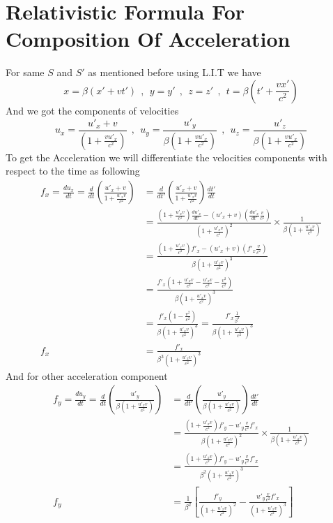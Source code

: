 \section{Relativistic Formula For Composition Of Acceleration}
For same $S$ and $S'$ as mentioned before using L.I.T we have 
\[
x= \beta(x'+vt') 
\ \ , \ \ 
y = y' 
\ \ , \ \ 
z = z' 
\ \ , \ \ 
t =\beta\left(t' + \frac{vx'}{c^2}\right)
\]
And we got the components of velocities
\[
u_x = \frac{u'_x + v}{\left(1 + \frac{vu'_x}{c^2}\right)}
\ \ , \ \ 
u_y = \frac{u'_y}{\beta\left(1 + \frac{vu'_x}{c^2}\right)}
\ \ , \ \ 
u_z = \frac{u'_z}{\beta\left(1 + \frac{vu'_x}{c^2}\right)}
\]
To get the Acceleration we will differentiate the velocities components with respect to the time as following
\begin{align*}
    f_x = \frac{du_x}{dt} = \frac{d}{dt}\left(\frac{u'_x+v}{1+\frac{u'_x v }{c^2}}\right)&= \frac{d}{dt'}\left(\frac{u'_x+v}{1+\frac{u'_x v }{c^2}}\right) \frac{dt'}{dt}\\
                          &= \frac{\left(1+\frac{u'_x v }{c^2}\right)\frac{du'_x}{dt'} - \left(u'_x+v\right)\left(\frac{du'_x}{dt'}\frac{v}{c^2}\right)}{{\left(1 + \frac{u'_x v}{c^2}\right)}^2} \times \frac{1}{\beta\left(1 + \frac{u'_x v}{c^2}\right)}\\
                          &= \frac{\left(1+\frac{u'_x v }{c^2}\right)f'_x - \left(u'_x+v\right)\left(f'_x\frac{v}{c^2}\right)}{\beta{\left(1 + \frac{u'_x v}{c^2}\right)}^3}\\
                          &= \frac{f'_x\left(1+\frac{u'_x v }{c^2} -\frac{u'_x v }{c^2} - \frac{v^2}{c^2}\right)}{\beta{\left(1 + \frac{u'_x v}{c^2}\right)}^3}\\
                          &= \frac{f'_x\left(1- \frac{v^2}{c^2}\right)}{\beta{\left(1 + \frac{u'_x v}{c^2}\right)}^3} = \frac{f'_x\frac{1}{\beta^2}}{\beta{\left(1 + \frac{u'_x v}{c^2}\right)}^3}\\
                      f_x &= \frac{f'_x}{\beta^3{\left(1 + \frac{u'_x v}{c^2}\right)}^3}
\end{align*}
And for other acceleration component
\begin{align*}
    f_y = \frac{du_y}{dt} = \frac{d}{dt}\left(\frac{u'_y}{\beta\left(1+\frac{u'_x v }{c^2}\right)}\right) &= \frac{d}{dt'}\left(\frac{u'_y}{\beta\left(1+\frac{u'_x v }{c^2}\right)}\right)\frac{dt'}{dt}\\
                          &= \frac{\left(1+\frac{u'_x v }{c^2}\right)f'_y - u'_y\frac{v}{c^2}f'_x}{{\beta\left(1 + \frac{u'_x v}{c^2}\right)}^2} \times \frac{1}{\beta\left(1 + \frac{u'_x v}{c^2}\right)}\\
                          &= \frac{\left(1+\frac{u'_x v }{c^2}\right)f'_y - u'_y\frac{v}{c^2}f'_x}{{\beta^2\left(1 + \frac{u'_x v}{c^2}\right)}^3}\\
                      f_y &=\frac{1}{\beta^2} \left[ \frac{f'_y}{{\left(1+\frac{u'_x v }{c^2}\right)}^2} - \frac{u'_y\frac{v}{c^2}f'_x}{{\left(1 + \frac{u'_x v}{c^2}\right)}^3}\right]
\end{align*}
